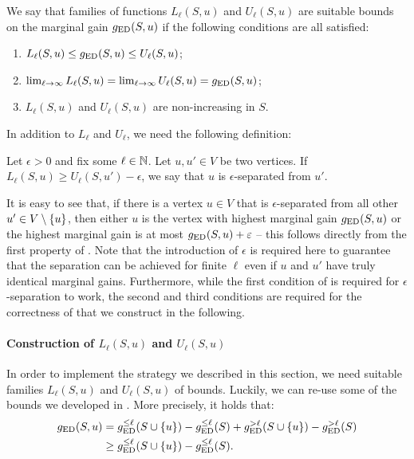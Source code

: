 \begin{definition}
\label{def:ged-walk:marg-bounds}
We say that families of functions $L_{\ell}(S, u)$ and $U_{\ell}(S, u)$
are suitable bounds on the marginal gain $g_{\text{ED}}(S, u)$ if the following
conditions are all satisfied:
\begin{enumerate}
\item $L_{\ell}(S, u) \le g_{\text{ED}}(S, u) \le U_{\ell}(S, u)$;
\item $\lim_{\ell \to \infty}L_{\ell}(S, u) = \lim_{\ell \to \infty}U_{\ell}(S, u) = g_{\text{ED}}(S, u)$;
\item $L_{\ell}(S, u)$ and $U_{\ell}(S, u)$ are non-increasing in $S$.
\end{enumerate}
\end{definition}

In addition to $L_{\ell}$ and $U_{\ell}$, we need the following definition:

\begin{definition}
\label{def:ged-walk:eps-sep}
Let $\epsilon > 0$ and fix some $\ell\in\mathbb{N}$.
Let $u, u'\in V$ be two vertices. If $L_{\ell}(S, u) \ge U_{\ell}(S, u') - \epsilon$,
we say that $u$ is $\epsilon$-separated from $u'$.
\end{definition}

It is easy to see that, if there is a vertex $u \in V$ that is $\epsilon$-separated
from all other $u'\in V\setminus \set{u}$, then either $u$ is the vertex with
highest marginal gain $g_{\text{ED}}(S, u)$ or the highest marginal gain is at most
$g_{\text{ED}}(S, u) + \varepsilon$ -- this follows directly from the first property of
.
%
Note that the introduction of $\epsilon$ is required here to guarantee that the
separation can be achieved for finite $\ell$ even if $u$ and $u'$ have truly
identical marginal gains.
%
Furthermore, while the first condition of  is
required for $\epsilon$-separation to work, the second and third conditions are
required for the correctness of  that we construct
in the following.

\paragraph{Construction of $L_{\ell}(S, u)$ and $U_{\ell}(S, u)$}
%
In order to implement the strategy we described in this section,
we need suitable families $L_{\ell}(S, u)$ and $U_{\ell}(S, u)$
of bounds. Luckily, we can re-use some of the bounds we developed
in .
More precisely, it holds that:
%
\begin{align*}
\ged(S, u) &= \gedll(S \cup \set{u}) - \gedll(S) + \gedgl(S \cup \set{u}) -
\gedgl(S)\\
           &\ge \gedll(S \cup \set{u}) - \gedll(S).
\end{align*}

